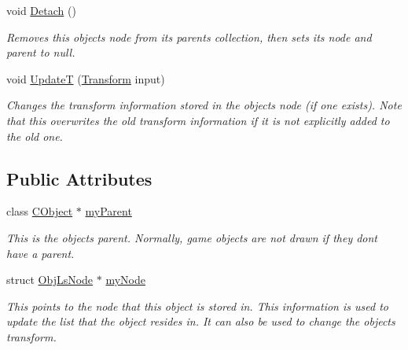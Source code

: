 \begin{DoxyCompactItemize}
void \hyperlink{class_object_ad818b7d495bf99bedcabfdf0f37774ac}{Detach} ()
\begin{DoxyCompactList}\small\item\em Removes this object\textquotesingle{}s node from its parent\textquotesingle{}s collection, then sets its node and parent to null. \end{DoxyCompactList}\item 
\hypertarget{class_object_a9df4b0c95c3af3a00f8193a4a8e5888c}{}\label{class_object_a9df4b0c95c3af3a00f8193a4a8e5888c} 
void \hyperlink{class_object_a9df4b0c95c3af3a00f8193a4a8e5888c}{UpdateT} (\hyperlink{class_transform}{Transform} input)
\begin{DoxyCompactList}\small\item\em Changes the transform information stored in the object\textquotesingle{}s node (if one exists). Note that this overwrites the old transform information if it is not explicitly added to the old one. \end{DoxyCompactList}\end{DoxyCompactItemize}
\subsection*{Public Attributes}
\begin{DoxyCompactItemize}
\item 
\hypertarget{class_object_a986b4a5516d90927038453711be9a4e8}{}\label{class_object_a986b4a5516d90927038453711be9a4e8} 
class \hyperlink{class_c_object}{C\+Object} $\ast$ \hyperlink{class_object_a986b4a5516d90927038453711be9a4e8}{my\+Parent}
\begin{DoxyCompactList}\small\item\em This is the object\textquotesingle{}s parent. Normally, game objects are not drawn if they don\textquotesingle{}t have a parent. \end{DoxyCompactList}\item 
\hypertarget{class_object_ab95df2681777f02917105b7797acde33}{}\label{class_object_ab95df2681777f02917105b7797acde33} 
struct \hyperlink{struct_obj_ls_node}{Obj\+Ls\+Node} $\ast$ \hyperlink{class_object_ab95df2681777f02917105b7797acde33}{my\+Node}
\begin{DoxyCompactList}\small\item\em This points to the node that this object is stored in. This information is used to update the list that the object resides in. It can also be used to change the object\textquotesingle{}s transform. \end{DoxyCompactList}\end{DoxyCompactItemize}


